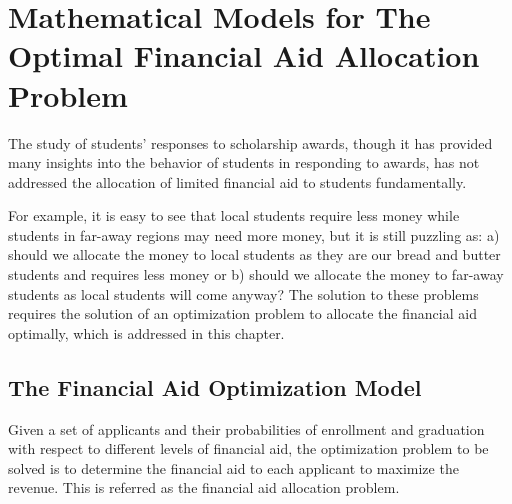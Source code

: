 \documentclass[12pt,english]{report}
\begin{document}

\chapter{Mathematical Models for The Optimal Financial Aid  Allocation Problem }
The study of students' responses to scholarship awards, though it has provided many insights into the behavior of students in responding to awards, has not addressed the allocation of limited financial aid to students fundamentally.

For example, it is easy to see that local students require less money while students in far-away regions may need more money,  but it is still puzzling as: a) should we allocate the money to local students as they are our bread and butter students and requires less money or b) should we allocate the money to far-away students as local students will come anyway? The solution to these problems requires the solution of an optimization problem to allocate the financial aid optimally, which is addressed in this chapter.

\section{The Financial Aid Optimization Model}
Given a set of applicants and their probabilities of enrollment and graduation with respect to different levels of financial aid, the optimization problem to be solved is to determine the financial aid to each applicant to  maximize the revenue. This is referred as the financial aid allocation problem.
\end{document}
